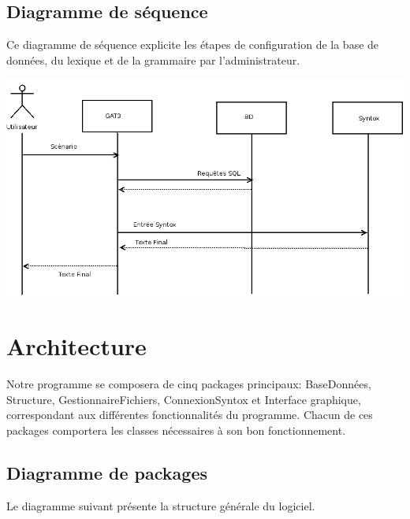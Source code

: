 \documentclass[12pt]{report}
\begin{document}
\subsection{Diagramme de séquence}

	Ce diagramme de séquence explicite les étapes de configuration de la base de données, du lexique et de la grammaire par l'administrateur. 

	\includegraphics[scale=0.4]{diasequence2.png}


\section{Architecture}
Notre programme se composera de cinq packages principaux: BaseDonnées, Structure, GestionnaireFichiers, ConnexionSyntox et Interface graphique, correspondant aux différentes fonctionnalités du programme.
Chacun de ces packages comportera les classes nécessaires à son bon fonctionnement.

\subsection{Diagramme de packages}
Le diagramme suivant présente la structure générale du logiciel.
\end{document}
